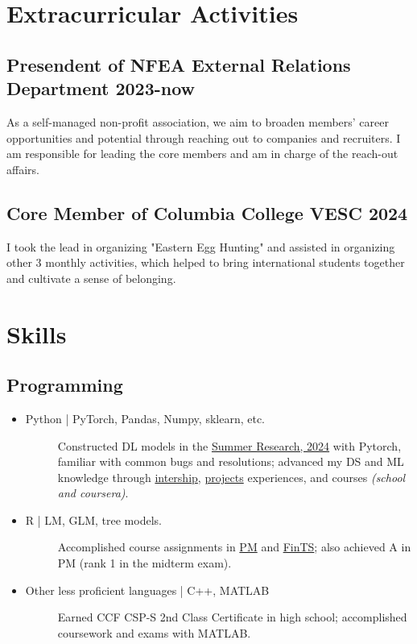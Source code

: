 \documentclass[a4paper]{article}
\begin{document}
\hypertarget{extra}{
\section{Extracurricular Activities}
}
\subsection{Presendent of NFEA External Relations Department \normalfont \hfill 2023-now}
As a self-managed non-profit association, we aim to broaden members' career opportunities and potential through reaching out to companies and recruiters. I am responsible for leading the core members and am in charge of the reach-out affairs. 
\subsection{Core Member of  Columbia College VESC \normalfont \hfill 2024}
I took the lead in organizing "Eastern Egg Hunting" and assisted in organizing other 3 monthly activities, which helped to bring international students together and cultivate a sense of belonging. 

\newpage
\section{Skills}

\subsection{Programming}
\begin{itemize}
    \item\begin{description}
            \item[Python | PyTorch, Pandas, Numpy, sklearn, etc.] 
            Constructed DL models in the \hyperlink{FBSDEs}{Summer Research, 2024} with Pytorch, familiar with common bugs and resolutions; advanced my DS and ML knowledge through \hyperlink{intern-exp}{intership}, \hyperlink{project-exp}{projects} experiences, and courses \textit{(school and coursera)}.
    \end{description}
    \item\begin{description}
        \item[R | LM, GLM, tree models.] 
        Accomplished course assignments in \hyperlink{PM}{PM} and \hyperlink{FinTS}{FinTS}; also achieved A in PM (rank 1 in the midterm exam).
    \end{description}
    \item \begin{description}
        \item[Other less proficient languages | C++, MATLAB] 
        Earned CCF CSP-S 2nd Class Certificate in high school; accomplished coursework and exams with MATLAB.
    \end{description}
\end{itemize}
\end{document}
